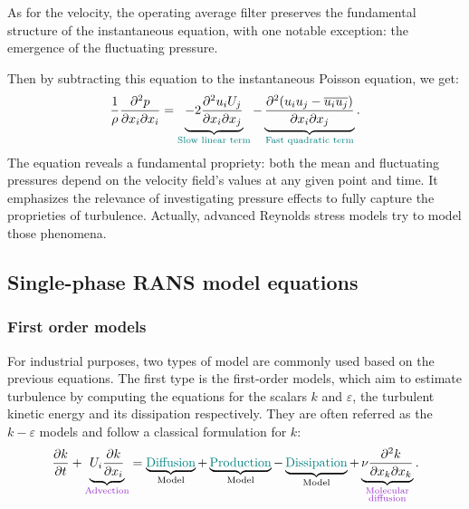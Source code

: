 As for the velocity, the operating average filter preserves the fundamental structure of the instantaneous equation, with one notable exception: the emergence of the fluctuating pressure.

Then by subtracting this equation to the instantaneous Poisson equation, we get: 
\begin{equation}
\frac{1}{\rho}\frac{\partial^2 p}{\partial x_i\partial x_i} = \underbrace{-2\frac{\partial^2 u_i U_j}{\partial x_i\partial x_j}}_{\color{myteal}\text{Slow linear term}} - \underbrace{\frac{\partial^2 (u_iu_j-\overline{u_iu_j})}{\partial x_i\partial x_j}}_{\color{myteal}\text{Fast quadratic term}}.
\end{equation}
The equation reveals a fundamental propriety: both the mean and fluctuating pressures depend on the velocity field's values at any given point and time. It emphasizes the relevance of investigating pressure effects to fully capture the proprieties of turbulence. Actually, advanced Reynolds stress models try to model those phenomena.

\subsection{Single-phase RANS model equations}

\subsubsection{First order models}

For industrial purposes, two types of model are commonly used based on the previous equations. The first type is the first-order models, which aim to estimate turbulence by computing the equations for the scalars $k$ and $\varepsilon$, the turbulent kinetic energy and its dissipation respectively. They are often referred as the $k-\varepsilon$ models and follow a classical formulation for $k$: 
\begin{equation}
        \frac{\partial k}{\partial t}+\underbrace{U_{i}\frac{\partial k}{\partial x_{i}}}_{\color{mydarkorchid}\text{Advection}} = \underbrace{{\color{myteal}\text{Diffusion}}}_{\text{Model}} + \underbrace{{\color{myteal}\text{Production}}}_{\text{Model}} - \underbrace{{\color{myteal} \text{Dissipation}}}_{\text{Model}} + \underbrace{{\nu\frac{\partial^2 k}{\partial x_k \partial x_k}}}_{\color{mydarkorchid}\substack{\text{Molecular}\\\text{diffusion}}} .
\end{equation}

